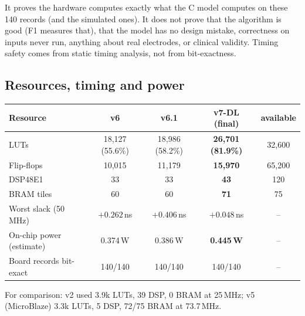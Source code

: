 \documentclass[11pt]{article}
\begin{document}
\begin{tried}
\end{tried}

\begin{warn}
It proves the hardware computes exactly what the C model computes on these 140 records (and the simulated ones). It does not prove that the algorithm is good (F1 measures that), that the model has no design mistake, correctness on inputs never run, anything about real electrodes, or clinical validity. Timing safety comes from static timing analysis, not from bit-exactness.
\end{warn}

\subsection{Resources, timing and power}
\begin{center}
\small
\begin{tabular}{@{}lcccc@{}}
\toprule
\textbf{Resource} & \textbf{v6} & \textbf{v6.1} & \textbf{v7-DL (final)} & \textbf{available} \\
\midrule
LUTs & 18,127 (55.6\%) & 18,986 (58.2\%) & \textbf{26,701 (81.9\%)} & 32,600 \\
Flip-flops & 10,015 & 11,179 & \textbf{15,970} & 65,200 \\
DSP48E1 & 33 & 33 & \textbf{43} & 120 \\
BRAM tiles & 60 & 60 & \textbf{71} & 75 \\
Worst slack (50\,MHz) & $+0.262$\,ns & $+0.406$\,ns & $\mathbf{+0.048}$\,ns & -- \\
On-chip power (estimate) & 0.374\,W & 0.386\,W & \textbf{0.445\,W} & -- \\
Board records bit-exact & 140/140 & 140/140 & 140/140 & -- \\
\bottomrule
\end{tabular}
\end{center}
For comparison: v2 used 3.9k LUTs, 39 DSP, 0 BRAM at 25\,MHz; v5 (MicroBlaze) 3.3k LUTs, 5 DSP, 72/75 BRAM at 73.7\,MHz.
\end{document}

